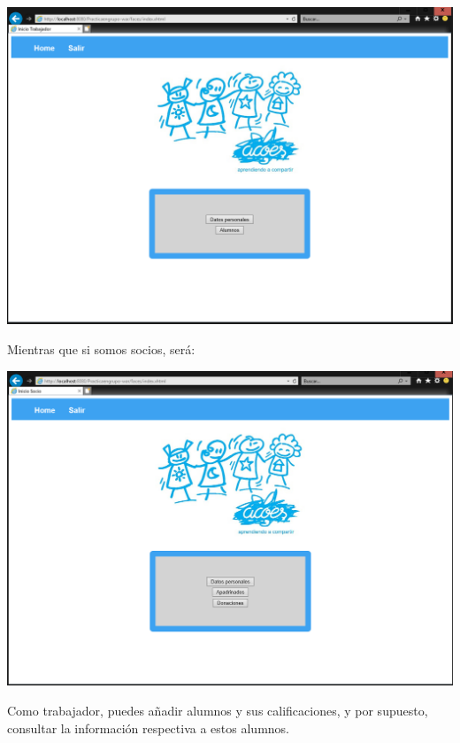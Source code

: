 \documentclass{article}
\begin{document}
\begin{center}
\includegraphics[scale=0.5]{capturas/INICIOTRABAJADORES.PNG}
\end{center}

Mientras que si somos socios, será:

\begin{center}
\includegraphics[scale=0.5]{capturas/INICIOSOCIOS.PNG}
\end{center}

Como trabajador, puedes añadir alumnos y sus calificaciones, y por supuesto, consultar la información respectiva a estos alumnos. 
\end{document}

